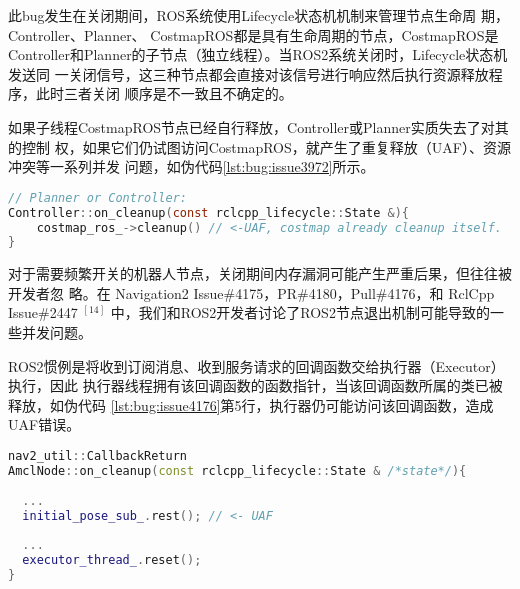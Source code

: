 此bug发生在关闭期间，ROS系统使用Lifecycle状态机机制来管理节点生命周
期，Controller、Planner、 CostmapROS都是具有生命周期的节点，CostmapROS是
Controller和Planner的子节点（独立线程）。当ROS2系统关闭时，Lifecycle状态机发送同
一关闭信号，这三种节点都会直接对该信号进行响应然后执行资源释放程序，此时三者关闭
顺序是不一致且不确定的。

如果子线程CostmapROS节点已经自行释放，Controller或Planner实质失去了对其的控制
权，如果它们仍试图访问CostmapROS，就产生了重复释放（UAF）、资源冲突等一系列并发
问题，如伪代码\ref{lst:bug:issue3972}所示。

\begin{lstlisting}[language=C, caption=漏洞\#3972问题代码, label=lst:bug:issue3972]
// Planner or Controller:
Controller::on_cleanup(const rclcpp_lifecycle::State &){
	costmap_ros_->cleanup() // <-UAF, costmap already cleanup itself.
}
\end{lstlisting}

对于需要频繁开关的机器人节点，关闭期间内存漏洞可能产生严重后果，但往往被开发者忽
略。在 Navigation2 Issue\#4175，PR\#4180，Pull\#4176，和 RclCpp Issue\#2447
$^{[14]}$ 中，我们和ROS2开发者讨论了ROS2节点退出机制可能导致的一些并发问题。

ROS2惯例是将收到订阅消息、收到服务请求的回调函数交给执行器（Executor）执行，因此
执行器线程拥有该回调函数的函数指针，当该回调函数所属的类已被释放，如伪代码
\ref{lst:bug:issue4176}第5行，执行器仍可能访问该回调函数，造成UAF错误。

\begin{lstlisting}[language=C++, caption=漏洞\#4176问题代码, label=lst:bug:issue4176]
nav2_util::CallbackReturn
AmclNode::on_cleanup(const rclcpp_lifecycle::State & /*state*/){
  
  ...
  initial_pose_sub_.rest(); // <- UAF
  
  ...
  executor_thread_.reset();
}

\end{lstlisting}

